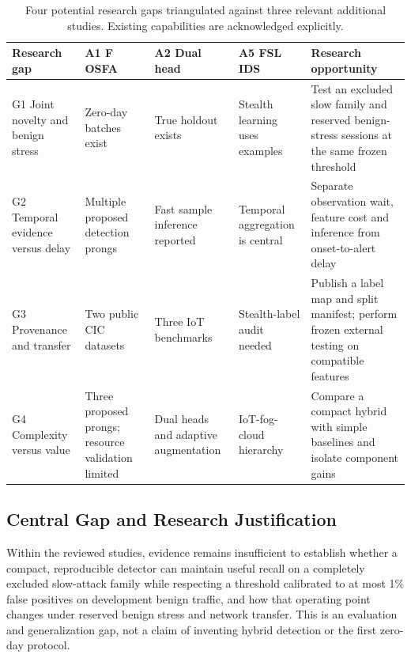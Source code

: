 \documentclass[conference]{IEEEtran}
\begin{document}
\begin{table}[!t]
\caption{Four potential research gaps triangulated against three relevant additional studies. Existing capabilities are acknowledged explicitly.}
\label{tab:gaps}
\centering\footnotesize\setlength{\tabcolsep}{2.2pt}\renewcommand{\arraystretch}{1.12}
\begin{tabular}{@{}>{\raggedright\arraybackslash}p{}>{\raggedright\arraybackslash}p{}>{\raggedright\arraybackslash}p{}>{\raggedright\arraybackslash}p{}>{\raggedright\arraybackslash}p{}@{}}\toprule
\textbf{Research gap} & \textbf{A1 F OSFA \cite{ref4}} & \textbf{A2 Dual head \cite{ref5}} & \textbf{A5 FSL IDS \cite{ref8}} & \textbf{Research opportunity}\\\midrule
G1 Joint novelty and benign stress & Zero-day batches exist & True holdout exists & Stealth learning uses examples & Test an excluded slow family and reserved benign-stress sessions at the same frozen threshold\\
\addlinespace[4pt]
G2 Temporal evidence versus delay & Multiple proposed detection prongs & Fast sample inference reported & Temporal aggregation is central & Separate observation wait, feature cost and inference from onset-to-alert delay\\
\addlinespace[4pt]
G3 Provenance and transfer & Two public CIC datasets & Three IoT benchmarks & Stealth-label audit needed & Publish a label map and split manifest; perform frozen external testing on compatible features\\
\addlinespace[4pt]
G4 Complexity versus value & Three proposed prongs; resource validation limited & Dual heads and adaptive augmentation & IoT-fog-cloud hierarchy & Compare a compact hybrid with simple baselines and isolate component gains\\
\bottomrule\end{tabular}
\end{table}

\subsection{Central Gap and Research Justification}
Within the reviewed studies, evidence remains insufficient to establish whether a compact, reproducible detector can maintain useful recall on a completely excluded slow-attack family while respecting a threshold calibrated to at most 1\% false positives on development benign traffic, and how that operating point changes under reserved benign stress and network transfer. This is an evaluation and generalization gap, not a claim of inventing hybrid detection or the first zero-day protocol.
\end{document}
